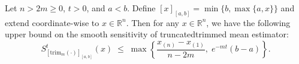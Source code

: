 Let $n>2m\ge 0$, $t>0$, and $a<b$. Define $[x]_{[a,b]}=\min\{b,\max\{a,x\}\}$ and extend coordinate-wise to $x\in\mathbb{R}^n$.
Then for any $x\in\mathbb{R}^n$, we have the following upper bound on the smooth sensitivity of truncatedtrimmed mean estimator:
\[
S^{t}_{[\mathrm{trim}_m(\cdot)]_{[a,b]}}(x)
\;\le\;
\max\left\{
\frac{x_{(n)}-x_{(1)}}{n-2m},\;
e^{-mt}(b-a)
\right\}.
\]